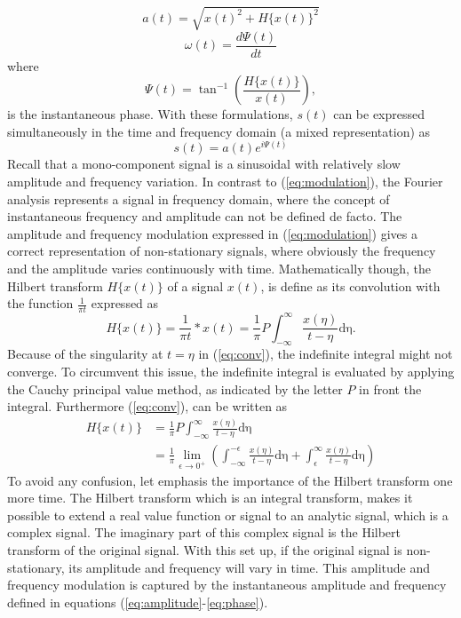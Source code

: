 \documentclass[../Main/thesis.tex]{subfiles}
\begin{document}
\begin{equation}\label{eq:amplitude}
a(t) = \sqrt{x(t)^{2} + H\{x(t) \}^{2} }
\end{equation}
\begin{equation}\label{eq:frequency}
\omega(t) = \frac{d \Psi(t)}{dt} 
\end{equation}
where 
\begin{equation}\label{eq:phase}
\Psi(t) = \tan^{-1}\left(\frac{H\{x(t) \}}{x(t)} \right),
\end{equation}
is the instantaneous phase. With these formulations, $s(t)$ can be expressed simultaneously in the time and frequency domain (a mixed representation) as 
\begin{equation}\label{eq:modulation}
s(t) = a(t)e^{i \Psi(t)} 
\end{equation}
Recall that a mono-component signal is a sinusoidal with relatively slow amplitude and frequency variation.
In contrast to (\ref{eq:modulation}), the Fourier analysis represents a signal in frequency domain, where the concept of instantaneous frequency and amplitude can not be defined de facto. The amplitude and frequency modulation expressed in (\ref{eq:modulation}) gives a correct representation of non-stationary signals, where obviously the frequency and the amplitude varies continuously with time.
\justify
Mathematically though, the Hilbert transform $H\{ x(t) \}$ of a signal $x(t)$, is define as its convolution with the function $\frac{1}{\pi t}$ expressed as
\begin{equation}\label{eq:conv}
H\{ x(t) \} = \frac{1}{\pi t}* x(t) = 	\frac{1}{\pi}P \int_{-\infty}^{\infty}\frac{x(\eta)}{t-\eta}\mathrm{d\eta}.
\end{equation}
Because of the singularity at $t=\eta$ in (\ref{eq:conv}), the indefinite integral might not converge. To circumvent this issue, the indefinite integral is evaluated by applying the Cauchy principal value method, as indicated by the letter $P$ in front the integral. Furthermore (\ref{eq:conv}), can be written as
\begin{equation}
\begin{split}
H\{ x(t) \} &=  \frac{1}{\pi}P \int_{-\infty}^{\infty}\frac{x(\eta)}{t-\eta}\mathrm{d\eta}\\
&= \frac{1}{\pi}\lim_{\epsilon\rightarrow 0^{+}} \left( \int_{-\infty}^{-\epsilon} \frac{x(\eta)}{t-\eta}\mathrm{d\eta} +   \int_{\epsilon}^{\infty} \frac{x(\eta)}{t-\eta}\mathrm{d\eta}     \right)
\end{split}
\end{equation}
\justify
To avoid any confusion, let emphasis the importance of the Hilbert transform one more time.
The Hilbert transform which is an integral transform, makes it possible to extend a real value function or signal to an analytic signal, which is a complex signal. The imaginary part of this complex signal is the Hilbert transform of the original signal. With this set up, if the original signal is non-stationary, its amplitude and frequency will vary in time. This amplitude and frequency modulation is captured by the instantaneous amplitude and frequency defined in equations (\ref{eq:amplitude}-\ref{eq:phase}).
\end{document}

